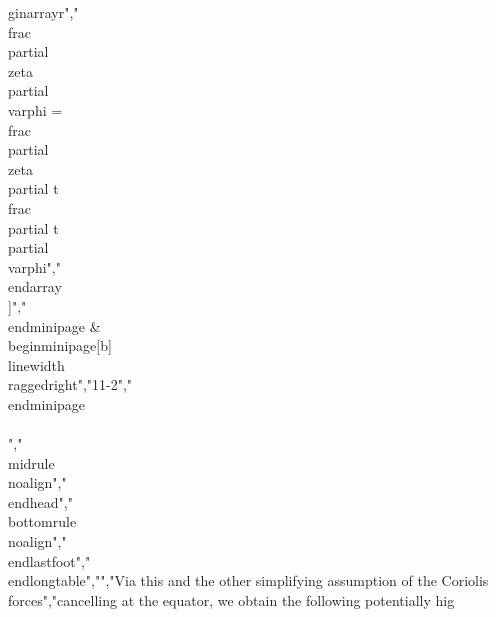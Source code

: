 {{{{{{{gin{array}{r}","\\frac{\\partial\\zeta}{\\partial\\varphi} = \\frac{\\partial\\zeta}{\\partial t}\\frac{\\partial t}{\\partial\\varphi}","\\end{array}\\]","\\end{minipage} & \\begin{minipage}[b]{\\linewidth}\\raggedright","11-2","\\end{minipage} \\\\","\\midrule\\noalign{}","\\endhead","\\bottomrule\\noalign{}","\\endlastfoot","\\end{longtable}","","Via this and the other simplifying assumption of the Coriolis forces","cancelling at the equator, we obtain the following potentially hig}}}}}}}
